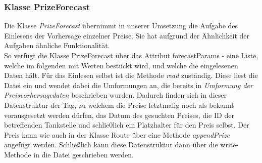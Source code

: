 \documentclass[11pt]{article}
\begin{document}
\subsubsection{Klasse PrizeForecast}
	Die Klasse \textit{PrizeForecast} übernimmt in unserer Umsetzung die Aufgabe des Einlesens der Vorhersage einzelner Preise. Sie hat aufgrund der Ähnlichkeit der Aufgaben ähnliche Funktionalität.\\ So verfügt die Klasse PrizeForecast über das Attribut forecastParams - eine Liste, welche im folgenden mit Werten bestückt wird, und welche die eingelesenen Daten hält. Für das Einlesen selbst ist die Methode \textit{read} zuständig. Diese liest die Datei ein und wendet dabei die Umformungen an, die bereits in \textit{Umformung der Preisvorhersagedaten} beschrieben wurden. Dadurch finden sich in dieser Datenstruktur der Tag, zu welchem die Preise letztmalig noch als bekannt vorausgesetzt werden dürfen, das Datum des gesuchten Preises, die ID der betreffenden Tankstelle und schlie0lich ein Platzhalter für den Preis selbst. Der Preis kann wie auch in der Klasse Route über eine Methode \textit{appendPrize} angefügt werden. Schließlich kann diese Datenstruktur dann über die write-Methode in die Datei geschrieben werden.
\end{document}
